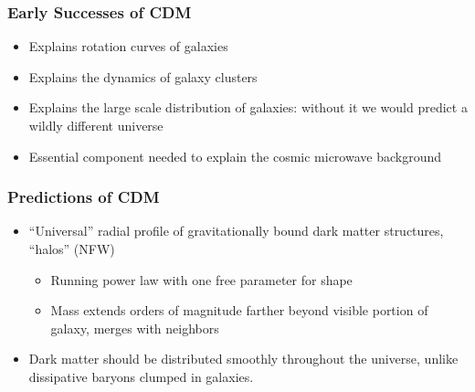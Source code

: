 \documentclass{beamer}
\begin{document}
\frame
{
    \frametitle{Early Successes of CDM}

 
    \begin{itemize}

        \item Explains rotation curves of galaxies

        \item Explains the dynamics of galaxy clusters

        \item Explains the large scale distribution of galaxies: without it we
          would predict a wildly different universe

        \item Essential component needed to explain the cosmic microwave
          background

    \end{itemize}

}

\frame
{
    \frametitle{Predictions of CDM}

 
    \begin{itemize}

        \item  ``Universal'' radial profile of gravitationally bound dark matter
            structures, ``halos'' (NFW)
            \begin{itemize}
                \item Running power law with one free parameter for shape
                \item Mass extends orders of magnitude farther beyond visible portion of galaxy,
                    merges with neighbors
            \end{itemize}


        \item  Dark matter should be distributed smoothly throughout the
            universe, unlike dissipative baryons clumped in galaxies.

    \end{itemize}

}
\end{document}
